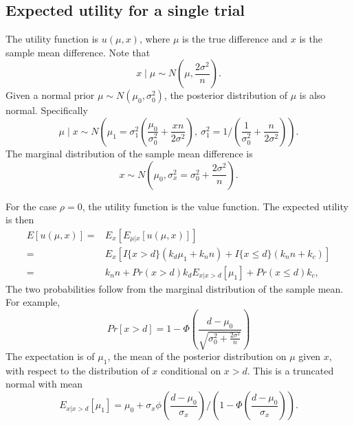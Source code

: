 \documentclass[sagev, Crown]{sagej}
\begin{document}
\subsection*{Expected utility for a single trial}

The utility function is $u(\mu, x)$, where $\mu$ is the true difference and $x$ is the sample mean difference. Note that
$$
x \mid \mu \sim N\left(\mu, \frac{2\sigma^2}{n} \right).
$$
Given a normal prior $\mu \sim N(\mu_0, \sigma_0^2)$, the posterior distribution of $\mu$ is also normal. Specifically
$$
\mu \mid x \sim N \left( \mu_1 = \sigma_1^2 \left( \frac{\mu_0}{\sigma_0^2} + \frac{xn}{2\sigma^2} \right), ~ \sigma_1^2 = 1/\left( \frac{1}{\sigma_0^2} + \frac{n}{2\sigma^2} \right) \right).
$$
The marginal distribution of the sample mean difference is
$$
x \sim N\left(\mu_0, \sigma_x^2 = \sigma_0^2 + \frac{2\sigma^2}{n} \right).
$$

For the case $\rho = 0$, the utility function is the value function. The expected utility is then
\begin{align*}
E[u(\mu, x)] =& E_x\left[ E_{\mu | x} [u(\mu, x)] \right] \\
=& E_x \left[ I\{x > d\} (k_d \mu_1 + k_n n) + I\{x \leq d\} (k_n n + k_c) \right] \\
=& k_n n + Pr(x > d) k_d E_{x | x > d} \left[ \mu_1 \right] + Pr(x \leq d)k_c,
\end{align*}
The two probabilities follow from the marginal distribution of the sample mean. For example,
$$
Pr[x > d] = 1- \Phi\left(\frac{d-\mu_0}{\sqrt{\sigma_0^2 + \frac{2\sigma^2}{n}}} \right)
$$
The expectation is of $\mu_1$, the mean of the posterior distribution on $\mu$ given $x$, with respect to the distribution of $x$ conditional on $x > d$. This is a truncated normal with mean
$$
E_{x | x > d} \left[ \mu_1 \right] = \mu_0 + \sigma_x \phi\left(\frac{d - \mu_0}{\sigma_x} \right)/\left(1 - \Phi\left(\frac{d - \mu_0}{\sigma_x}\right) \right).
$$
\end{document}
